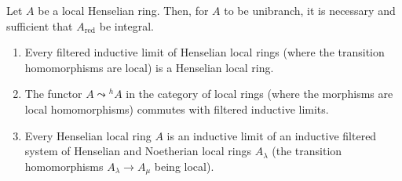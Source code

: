 \begin{corollary}[18.6.13]
\label{IV.18.6.13}
Let $A$ be a local Henselian ring.
Then, for $A$ to be unibranch, it is necessary and sufficient that $A_{\mathrm{red}}$ be integral.
\end{corollary}

\begin{proposition}[18.6.14]
\label{IV.18.6.14}
\begin{enumerate}[label=\emph{\roman*)}]
  \item Every filtered inductive limit of Henselian local rings (where the transition homomorphisms are local) is a Henselian local ring.
  \item The functor $A\leadsto{}^h\!A$ in the category of local rings (where the morphisms are local homomorphisms) commutes with filtered inductive limits.
  \item Every Henselian local ring $A$ is an inductive limit of an inductive filtered system of Henselian and Noetherian local rings $A_\lambda$ (the transition homomorphisms $A_\lambda\to A_\mu$ being local).
\end{enumerate}
\end{proposition}

